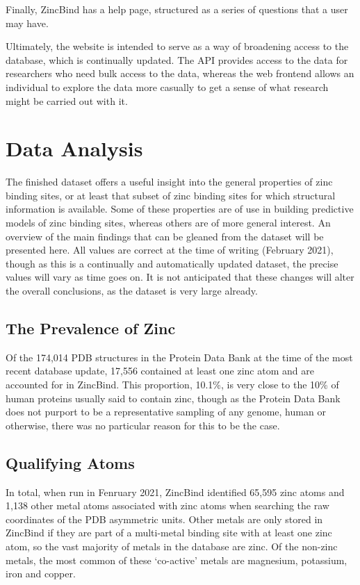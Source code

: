 Finally, ZincBind has a help page, structured as a series of questions that a user may have.

Ultimately, the website is intended to serve as a way of broadening access to the database, which is continually updated. The API provides access to the data for researchers who need bulk access to the data, whereas the web frontend allows an individual to explore the data more casually to get a sense of what research might be carried out with it.

\section{Data Analysis}

The finished dataset offers a useful insight into the general properties of zinc binding sites, or at least that subset of zinc binding sites for which structural information is available. Some of these properties are of use in building predictive models of zinc binding sites, whereas others are of more general interest. An overview of the main findings that can be gleaned from the dataset will be presented here. All values are correct at the time of writing (February 2021), though as this is a continually and automatically updated dataset, the precise values will vary as time goes on. It is not anticipated that these changes will alter the overall conclusions, as the dataset is very large already.

\subsection{The Prevalence of Zinc}

Of the 174,014 PDB structures in the Protein Data Bank at the time of the most recent database update, 17,556 contained at least one zinc atom and are accounted for in ZincBind. This proportion, 10.1\%, is very close to the 10\% of human proteins usually said to contain zinc, though as the Protein Data Bank does not purport to be a representative sampling of any genome, human or otherwise, there was no particular reason for this to be the case.

\subsection{Qualifying Atoms}

In total, when run in Fenruary 2021, ZincBind identified 65,595 zinc atoms and 1,138 other metal atoms associated with zinc atoms when searching the raw coordinates of the PDB asymmetric units. Other metals are only stored in ZincBind if they are part of a multi-metal binding site with at least one zinc atom, so the vast majority of metals in the database are zinc. Of the non-zinc metals, the most common of these `co-active' metals are magnesium, potassium, iron and copper.

